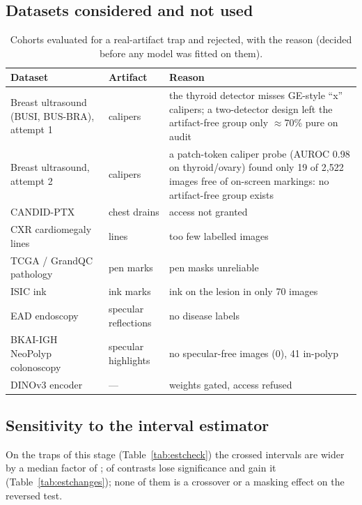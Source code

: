 \subsection{Datasets considered and not used}
\begin{table}[H]\centering\scriptsize
\caption{Cohorts evaluated for a real-artifact trap and rejected, with the reason (decided before any model was fitted on
them).}\label{tab:rejected}
\begin{tabular}{p{3.4cm}p{2.6cm}p{9.2cm}}\toprule
Dataset & Artifact & Reason \\\midrule
Breast ultrasound (BUSI, BUS-BRA), attempt 1 & calipers & the thyroid detector misses GE-style ``x'' calipers; a two-detector design left the artifact-free group only $\approx$70\% pure on audit \\
Breast ultrasound, attempt 2 & calipers & a patch-token caliper probe (AUROC 0.98 on thyroid/ovary) found only 19 of 2,522 images free of on-screen markings: no artifact-free group exists \\
CANDID-PTX & chest drains & access not granted \\
CXR cardiomegaly lines & lines & too few labelled images \\
TCGA / GrandQC pathology & pen marks & pen masks unreliable \\
ISIC ink & ink marks & ink on the lesion in only 70 images \\
EAD endoscopy & specular reflections & no disease labels \\
BKAI-IGH NeoPolyp colonoscopy & specular highlights & no specular-free images (0), 41 in-polyp \\
DINOv3 encoder & --- & weights gated, access refused \\
\bottomrule\end{tabular}\end{table}

\subsection{Sensitivity to the interval estimator}
On the traps of this stage (Table~\ref{tab:estcheck}) the crossed intervals are wider by a median factor of
\sThreeEstMed; \sThreeEstLost{} of \sThreeEstN{} contrasts lose significance and \sThreeEstGained{} gain it
(Table~\ref{tab:estchanges}); none of them is a crossover or a masking effect on the reversed test.




